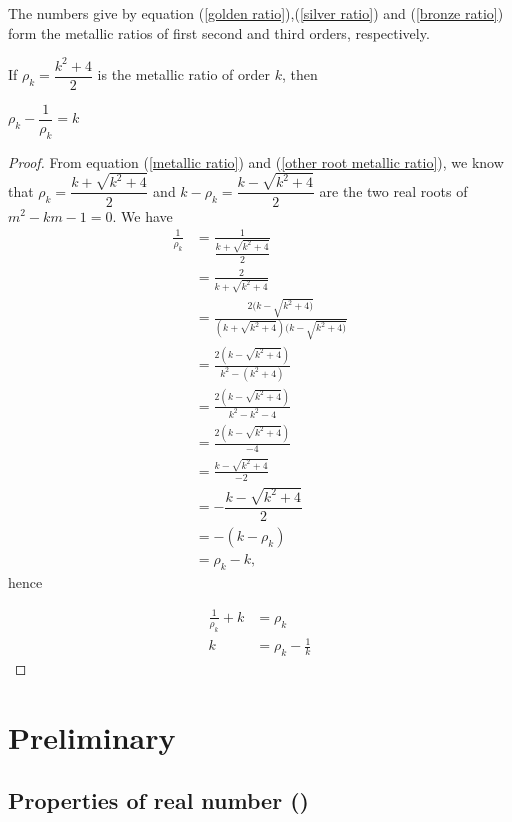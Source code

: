 \documentclass{rmutt-seminar}
\begin{document}
\begin{definition}
\end{definition}
The numbers give by equation (\ref{golden ratio}),(\ref{silver ratio}) and (\ref{bronze ratio}) form the metallic ratios of first second and third orders, respectively.
\begin{lemma}\label{lemma}
	If $\rho_{k}= \dfrac{k^2 + 4}{2} $ is the metallic ratio of order $ k $, then
	\begin{center}
		$ \rho_{k} - \dfrac{1}{\rho_{k}}=k$ 
	\end{center}
\end{lemma}	
\begin{proof}
	From equation (\ref{metallic ratio}) and (\ref{other root metallic ratio}), we know that $\rho_{k} = \dfrac{k+\sqrt{k^2+4}}{2}$ and $k - \rho_{k} = \dfrac{k-\sqrt{k^2 + 4}}{2}$ are the two real roots of $ m^2 - km -1 = 0 $. We have 
	\begin{align*}
		\frac{1}{\rho_k} &= \frac{1 }{\dfrac{k+\sqrt{k^2 +4}}{2}} \\
		&=\frac{2}{k + \sqrt{k^2 + 4}} \\
		&=\frac{2(k-\sqrt{k^2 + 4)}}{(k + \sqrt{k^2 + 4})(k-\sqrt{k^2 + 4)} } \\
		&= \frac{2(k - \sqrt{k^2 + 4})}{k^2-(k^2+4)} \\
		&= \frac{2(k - \sqrt{k^2 + 4})}{k^2 - k^2 -4}\\
		&= \frac{2(k - \sqrt{k^2 + 4})}{-4}\\
		&= \frac{k - \sqrt{k^2 + 4}}{-2}\\
		&= - \dfrac{k-\sqrt{k^2 + 4}}{2} \\
		&= -(k-\rho_k) \\
		&= \rho_k-k,
	\end{align*}
hence 

\begin{align*}
	\frac{1}{\rho_k}+k&=\rho_k \\
	k &= \rho_k - \frac{1}{k} 
\end{align*}

\end{proof}
\section{Preliminary}
\subsection*{Properties of real number (\cite{MIDC14}) }
\end{document}
